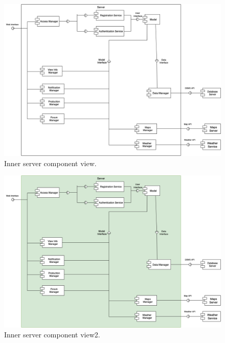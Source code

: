 \begin{figure}[H]
    \begin{center}
    \includegraphics[width=1\textwidth]{images/ServerComponent1.png}
    \caption{Inner server component view.}
    \label{fig:server component view}
    \end{center}
\end{figure}

\begin{figure}[H]
    \begin{center}
    \includegraphics[width=1\textwidth]{images/ServerComponent2.png}
    \caption{Inner server component view2.}
    \label{fig:server component view2}
    \end{center}
\end{figure}

